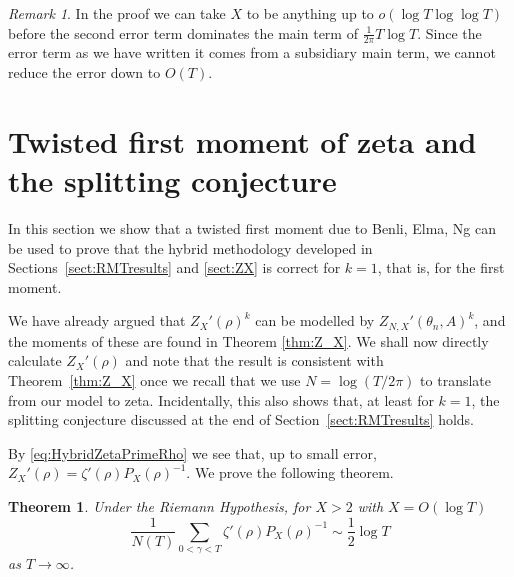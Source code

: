 \documentclass[12pt,a4paper,reqno]{amsart}
\newtheorem{theorem}{Theorem}
\theoremstyle{remark}
\newtheorem*{remark}{Remark}
\numberwithin{equation}{section}
\begin{document}
\begin{remark}
    In the proof we can take $X$ to be anything up to $o(\log T \log\log T)$ before the second error term dominates the main term of $\frac{1}{2\pi} T\log T$. Since the error term as we have written it comes from a subsidiary main term, we cannot reduce the error down to  $O(T)$.
\end{remark}

\section{Twisted first moment of zeta and the splitting conjecture}\label{sect:twisted}

In this section we show that a twisted first moment due to Benli, Elma, Ng \cite{BEN23} can be used to prove that the hybrid methodology developed in Sections~\ref{sect:RMTresults} and \ref{sect:ZX} is correct for $k=1$, that is, for the first moment.

We have already argued that $Z_X'(\rho)^k$ can be modelled by $Z_{N,X}'(\theta_n,A)^k$, and the moments of these are found in Theorem \ref{thm:Z_X}. We shall now directly calculate $Z_X'(\rho)$ and note that the result is consistent with Theorem~\ref{thm:Z_X} once we recall that we use $N=\log(T/2\pi)$ to translate from our model to zeta. Incidentally, this also shows that, at least for $k=1$, the splitting conjecture discussed at the end of Section~\ref{sect:RMTresults} holds.

By \eqref{eq:HybridZetaPrimeRho} we see that, up to small error, $Z_X'(\rho) = \zeta'(\rho) P_X(\rho)^{-1}$. We prove the following theorem.
\begin{theorem}\label{thm:twist}
    Under the Riemann Hypothesis, for $X>2$ with $X=O(\log T)$
    \[
    \frac{1}{N(T)} \sum_{0<\gamma<T} \zeta'(\rho) P_X(\rho)^{-1} \sim \frac{1}{2} \log T
    \]
    as $T \rightarrow \infty$.
\end{theorem}
\end{document}
